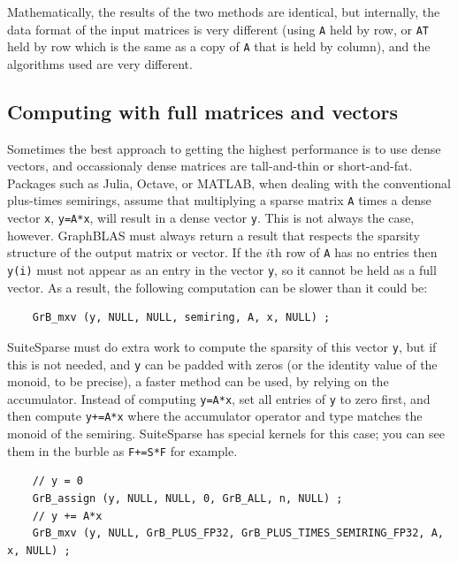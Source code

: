 Mathematically, the results of the two methods are identical, but internally,
the data format of the input matrices is very different (using \verb'A' held
by row, or \verb'AT' held by row which is the same as a copy of \verb'A' that
is held by column), and the algorithms used are very different.

\subsection{Computing with full matrices and vectors}

Sometimes the best approach to getting the highest performance is to use dense
vectors, and occassionaly dense matrices are tall-and-thin or short-and-fat.
Packages such as Julia, Octave, or MATLAB, when dealing with the conventional
plus-times semirings, assume that multiplying a sparse matrix \verb'A' times a
dense vector \verb'x', \verb'y=A*x', will result in a dense vector \verb'y'.
This is not always the case, however. GraphBLAS must always return a result
that respects the sparsity structure of the output matrix or vector.  If the
$i$th row of \verb'A' has no entries then \verb'y(i)' must not appear as an
entry in the vector \verb'y', so it cannot be held as a full vector.  As a
result, the following computation can be slower than it could be:

    {\footnotesize
    \begin{verbatim}
    GrB_mxv (y, NULL, NULL, semiring, A, x, NULL) ; \end{verbatim}}

SuiteSparse must do extra work to compute the sparsity of this vector \verb'y',
but if this is not needed, and \verb'y' can be padded with zeros (or
the identity value of the monoid, to be precise), a faster method can be used,
by relying on the accumulator.  Instead of computing \verb'y=A*x', set all
entries of \verb'y' to zero first, and then compute \verb'y+=A*x' where the
accumulator operator and type matches the monoid of the semiring.  SuiteSparse
has special kernels for this case; you can see them in the burble as
\verb'F+=S*F' for example.

    {\footnotesize
    \begin{verbatim}
    // y = 0
    GrB_assign (y, NULL, NULL, 0, GrB_ALL, n, NULL) ;
    // y += A*x
    GrB_mxv (y, NULL, GrB_PLUS_FP32, GrB_PLUS_TIMES_SEMIRING_FP32, A, x, NULL) ; \end{verbatim}}

